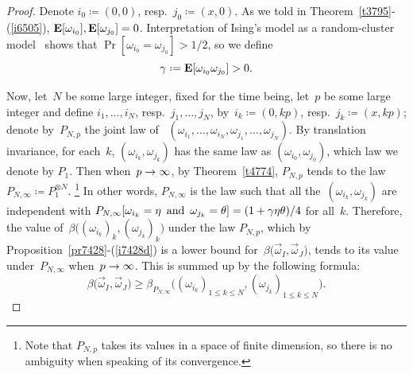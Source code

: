 \begin{proof}
Denote $i_0 \coloneqq (0,0)$, resp.\ $j_0 \coloneqq (x,0)$.
As we told in Theorem~\ref{t3795}-(\ref{i6505}),
$\mathop{\smash{\mathbf{E}}}\nolimits[\omega_{i_0}], \mathop{\smash{\mathbf{E}}}\nolimits[\omega_{j_0}] = 0$.
Interpretation of Ising's model as a random-cluster model~\cite[\S~1.4]{Grimmett}
shows that $\Pr[\omega_{i_0}=\omega_{j_0}] > 1/2$,
so we define
\[ \gamma \coloneqq \EE[\omega_{i_0}\omega_{j_0}] > 0 .\]

Now, let~$N$ be some large integer, fixed for the time being,
let~$p$ be some large integer and define
$i_1, \ldots, i_N$, resp.~$j_1, \ldots, j_N$,
by~$i_k \coloneqq (0,kp)$, resp.\ $j_k \coloneqq (x,kp)$;
denote by~$P_{N,p}$ the joint law of~%
$(\omega_{i_1},\ldots,\omega_{i_N},\omega_{j_1},\ldots,\omega_{j_N})$.
By translation invariance, for each~$k$,
$(\omega_{i_k},\omega_{j_k})$ has the same law as $(\omega_{i_0},\omega_{j_0})$,
which law we denote by $P_1$.
%
Then when~$p \to \infty$, by Theorem~\ref{t4774},
$P_{N,p}$ tends to the law $P_{N,\infty} \coloneqq P_1^{\otimes N}$.%
\footnote{Note that $P_{N,p}$
takes its values in a space of finite dimension,
so there is no ambiguity when speaking of its convergence.}
In other words, $P_{N,\infty}$ is the law such that
all the~$(\omega_{i_k},\omega_{j_k})$ are independent
with $P_{N,\infty}[\omega_{i_k}=\eta \enskip\text{and}\enskip \omega_{j_k}=\theta]
= (1+\gamma\eta\theta)/4$ for all~$k$.
%
Therefore, the value of~$\beta\big((\omega_{i_k})_k, (\omega_{j_k})_k\big)$
under the law $P_{N,p}$, which by Proposition~\hbox{\ref{pr7428}-(\ref{i7428d})}
is a lower bound for~$\beta \big(\vec\omega_I , \vec\omega_J \big)$,
tends to its value under~$P_{N,\infty}$ when~$p \to \infty$.
This is summed up by the following formula:
\[\label{fo7691} \beta \big(\vec\omega_I, \vec\omega_J\big) \geq \beta_{P_{N,\infty}}
\big((\omega_{i_k})_{1\leq k\leq N}, (\omega_{j_k})_{1\leq k\leq N}\big) .\]


\end{proof}
